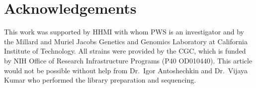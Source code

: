 \documentclass[10pt, twocolumn]{article}
\begin{document}
\section*{Acknowledgements}
This work was supported by HHMI with whom PWS is an investigator and by the
Millard and Muriel Jacobs Genetics and Genomics Laboratory at California
Institute of Technology. All strains were provided by the CGC, which is funded
by NIH Office of Research Infrastructure Programs (P40 OD010440). This article
would not be possible without help from Dr.\ Igor Antoshechkin and Dr.\ Vijaya
Kumar who performed the library preparation and sequencing.



\end{document}
